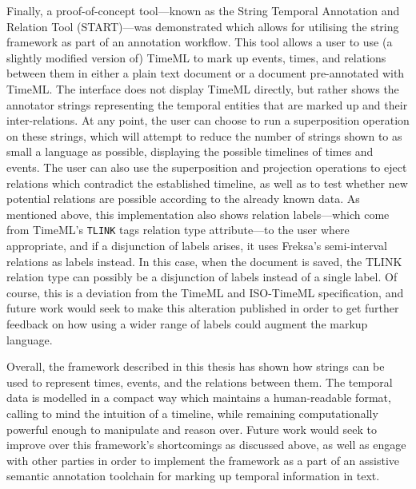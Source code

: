 \documentclass[a4paper,12pt,leqno,twoside]{article}
\begin{document}
Finally, a proof-of-concept tool---known as the String Temporal Annotation and Relation Tool (START)---was demonstrated which allows for utilising the string framework as part of an annotation workflow. This tool allows a user to use (a slightly modified version of) TimeML to mark up events, times, and relations between them in either a plain text document or a document pre-annotated with TimeML. The interface does not display TimeML directly, but rather shows the annotator strings representing the temporal entities that are marked up and their inter-relations. At any point, the user can choose to run a superposition operation on these strings, which will attempt to reduce the number of strings shown to as small a language as possible, displaying the possible timelines of times and events. The user can also use the superposition and projection operations to eject relations which contradict the established timeline, as well as to test whether new potential relations are possible according to the already known data. As mentioned above, this implementation also shows relation labels---which come from TimeML's \texttt{TLINK} tags relation type attribute---to the user where appropriate, and if a disjunction of labels arises, it uses Freksa's semi-interval relations as labels instead. In this case, when the document is saved, the TLINK relation type can possibly be a disjunction of labels instead of a single label. Of course, this is a deviation from the TimeML and ISO-TimeML specification, and future work would seek to make this alteration published in order to get further feedback on how using a wider range of labels could augment the markup language.

Overall, the framework described in this thesis has shown how strings can be used to represent times, events, and the relations between them. The temporal data is modelled in a compact way which maintains a human-readable format, calling to mind the intuition of a timeline, while remaining computationally powerful enough to manipulate and reason over. Future work would seek to improve over this framework's shortcomings as discussed above, as well as engage with other parties in order to implement the framework as a part of an assistive semantic annotation toolchain for marking up temporal information in text.

\end{document}
